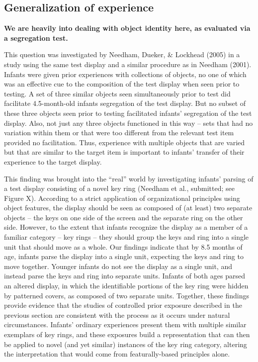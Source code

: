 \subsection{Generalization of experience}

{
\bf We are heavily into dealing with object identity here,
as evaluated via a segregation test.
}

This question was investigated by Needham, Dueker, \& Lockhead (2005)
in a study using the same test display and a similar procedure as in
Needham (2001).  Infants were given prior experiences with collections
of objects, no one of which was an effective cue to the composition of
the test display when seen prior to testing.  A set of three similar
objects seen simultaneously prior to test did facilitate 4.5-month-old
infants segregation of the test display.  But no subset of these three
objects seen prior to testing facilitated infants' segregation
of the test display.  Also, not just any three objects functioned in
this way -- sets that had no variation within them or that were
too different from the relevant test item provided no facilitation.
Thus, experience with multiple objects that are varied but that are
similar to the target item is important to infants' transfer
of their experience to the target display.



This finding was brought into the ``real'' world by investigating
infants' parsing of a test display consisting of a novel key
ring (Needham et al., submitted; see Figure X).  According to a strict
application of organizational principles using object features, the
display should be seen as composed of (at least) two separate
objects -- the keys on one side of the screen and the separate
ring on the other side.  However, to the extent that infants recognize
the display as a member of a familiar category -- key
rings -- they should group the keys and ring into a single unit
that should move as a whole.  Our findings indicate that by 8.5 months
of age, infants parse the display into a single unit, expecting the
keys and ring to move together.  Younger infants do not see the
display as a single unit, and instead parse the keys and ring into
separate units.  Infants of both ages parsed an altered display, in
which the identifiable portions of the key ring were hidden by
patterned covers, as composed of two separate units.  Together, these
findings provide evidence that the studies of controlled prior
exposure described in the previous section are consistent with the
process as it occurs under natural circumstances.  Infants'
ordinary experiences present them with multiple similar exemplars of
key rings, and these exposures build a representation that can then be
applied to novel (and yet similar) instances of the key ring category,
altering the interpretation that would come from featurally-based
principles alone.



